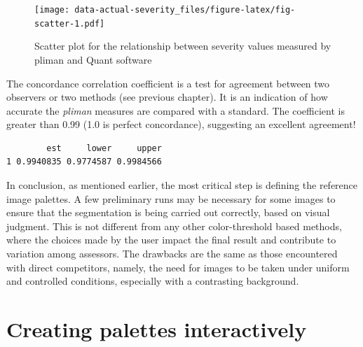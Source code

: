 \documentclass[
  letterpaper,
]{book}
\newenvironment{Shaded}{\begin{snugshade}}{\end{snugshade}}
\newcommand{\FunctionTok}[1]{\textcolor[rgb]{0.28,0.35,0.67}{#1}}
\newcommand{\NormalTok}[1]{\textcolor[rgb]{0.00,0.23,0.31}{#1}}
\newcommand{\OtherTok}[1]{\textcolor[rgb]{0.00,0.23,0.31}{#1}}
\newcommand{\SpecialCharTok}[1]{\textcolor[rgb]{0.37,0.37,0.37}{#1}}
\begin{document}
\begin{figure}

{\centering \texttt{[image: data-actual-severity\_files/figure-latex/fig-scatter-1.pdf]}

}

\caption{\label{fig-scatter}Scatter plot for the relationship between
severity values measured by pliman and Quant software}

\end{figure}

The concordance correlation coefficient is a test for agreement between
two observers or two methods (see previous chapter). It is an indication
of how accurate the \emph{pliman} measures are compared with a standard.
The coefficient is greater than 0.99 (1.0 is perfect concordance),
suggesting an excellent agreement!

\begin{Shaded}
\end{Shaded}

\begin{verbatim}
        est     lower     upper
1 0.9940835 0.9774587 0.9984566
\end{verbatim}

In conclusion, as mentioned earlier, the most critical step is defining
the reference image palettes. A few preliminary runs may be necessary
for some images to ensure that the segmentation is being carried out
correctly, based on visual judgment. This is not different from any
other color-threshold based methods, where the choices made by the user
impact the final result and contribute to variation among assessors. The
drawbacks are the same as those encountered with direct competitors,
namely, the need for images to be taken under uniform and controlled
conditions, especially with a contrasting background.

\hypertarget{creating-palettes-interactively}{%
\section{Creating palettes
interactively}\label{creating-palettes-interactively}}
\end{document}
